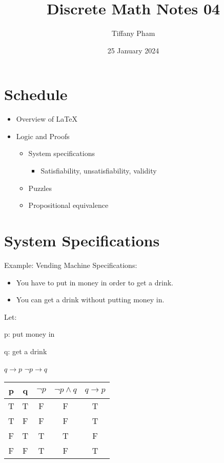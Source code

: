 \documentclass{article}
\title{Discrete Math Notes 04}
\author{Tiffany Pham}
\date{25 January 2024}
\begin{document}
\maketitle

\section{Schedule}
\begin{itemize}
    \item Overview of LaTeX
    \item Logic and Proofs
    \begin{itemize}
        \item System specifications
        \begin{itemize}
            \item Satisfiability, unsatisfiability, validity
        \end{itemize}
        \item Puzzles
        \item Propositional equivalence
    \end{itemize}
\end{itemize}

\section{System Specifications}
Example: Vending Machine
\hfill \break
Specifications:
\begin{itemize}
    \item You have to put in money in order to get a drink.
    \item You can get a drink without putting money in.
\end{itemize}
Let:

p: put money in

q: get a drink

\hfill \break
$q \rightarrow p$
\hfill \break
$\lnot p\rightarrow q$
\begin{center}
\begin{tabular}{ |c|c|c|c|c| } 
 \hline
 p & q & $\lnot p$ & $\lnot p\land q$ & $q\rightarrow p$ \\ 
 \hline
 T & T & F & F & T \\ 
 T & F & F & F & T \\
 F & T & T & T & F \\
 F & F & T & F & T \\
 \hline
\end{tabular}
\end{center}
\end{document}
